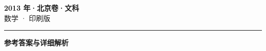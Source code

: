 \documentclass[zihao=5, a4paper]{ctexart}
\begin{document}
\begin{center}
  {\Large\bfseries 2013 年·北京卷·文科}\\[4pt]
  {\large 数学 · 印刷版}
\end{center}
\medskip
{}

\par\bigskip\hrule\bigskip
{}
\Needspace{0.55\textheight}
\begin{center}{\large\bfseries 参考答案与详细解析}\end{center}
\smallskip

\end{document}
